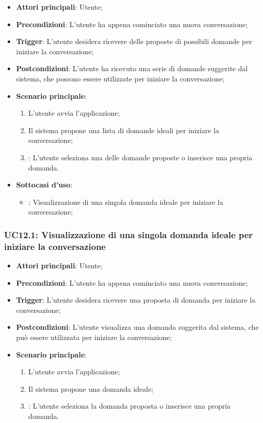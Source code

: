 \begin{itemize}
    \item \textbf{Attori principali}: Utente;
    \item \textbf{Precondizioni}: L'utente ha appena cominciato una nuova conversazione;
    \item \textbf{Trigger}: L'utente desidera ricevere delle proposte di possibili domande per iniziare la conversazione;
    \item \textbf{Postcondizioni}: L'utente ha ricevuto una serie di domande suggerite dal sistema, che possono essere utilizzate per iniziare la conversazione;
    \item \textbf{Scenario principale}:
    \begin{enumerate}
        \item L'utente avvia l'applicazione;
        \item Il sistema propone una lista di domande ideali per iniziare la conversazione;
        \item {}: L'utente seleziona una delle domande proposte o inserisce una propria domanda.
    \end{enumerate}
    \item \textbf{Sottocasi d'uso}:
    \begin{itemize}
        \item {}: Visualizzazione di una singola domanda ideale per iniziare la conversazione;
    \end{itemize}
\end{itemize}

\hypertarget{UC12.1}{}
\subsubsection{UC12.1: Visualizzazione di una singola domanda ideale per iniziare la conversazione}
\begin{itemize}
    \item \textbf{Attori principali}: Utente;
    \item \textbf{Precondizioni}: L'utente ha appena cominciato una nuova conversazione;
    \item \textbf{Trigger}: L'utente desidera ricevere una proposta di domanda per iniziare la conversazione;
    \item \textbf{Postcondizioni}: L'utente visualizza una domanda suggerita dal sistema, che può essere utilizzata per iniziare la conversazione;
    \item \textbf{Scenario principale}:
    \begin{enumerate}
        \item L'utente avvia l'applicazione;
        \item Il sistema propone una domanda ideale;
        \item {}: L'utente seleziona la domanda proposta o inserisce una propria domanda.
    \end{enumerate}
\end{itemize}


